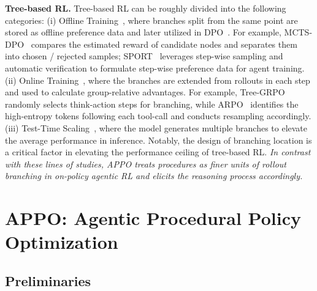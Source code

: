 \documentclass{article}
\begin{document}
\noindent\textbf{Tree-based RL.}
Tree-based RL can be roughly divided into the following categories: (i) Offline Training~\cite{feng2023alphazero,lai2024step,li2025iterative,xie2024monte}, where  branches split from the same point are stored as offline preference data and later utilized in DPO~\cite{rafailov2023direct}. For example, MCTS-DPO~\cite{xie2024monte} compares the estimated reward of candidate nodes and separates them into chosen / rejected samples; SPORT~\cite{li2025iterative} leverages step-wise sampling and automatic verification to formulate step-wise preference data for agent training. (ii) Online Training~\cite{hou2025treerl,ji2025tree,dong2025agentic,dong2025agentic1,zhao2026training}, where the branches are extended from rollouts in each step and used to calculate group-relative advantages. For example, Tree-GRPO~\cite{ji2025tree} randomly selects think-action steps for branching, while ARPO~\cite{dong2025agentic} identifies the high-entropy tokens following each tool-call and conducts resampling accordingly. (iii) Test-Time Scaling~\cite{wang2026textbf,snell2024scaling,wu2024inference,welleck2024decoding,muennighoff2025s1}, where the model generates multiple branches to elevate the average performance in inference. Notably, the design of branching location is a critical factor in elevating the performance ceiling of tree-based RL.  \textit{In contrast with these lines of studies, APPO treats procedures as finer units of rollout branching in on-policy agentic RL and elicits the reasoning process accordingly. } 


 \section{APPO: Agentic Procedural Policy Optimization}

\subsection{Preliminaries}
\end{document}
